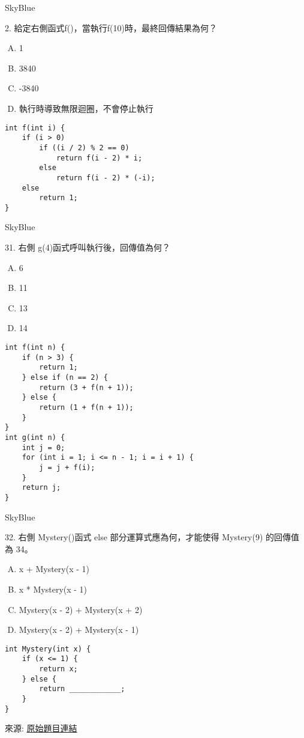 \documentclass{article}
\begin{document}
\renewcommand{\baselinestretch}{1.5}


\begin{sblock}{SkyBlue}

2. 給定右側函式f()，當執行f(10)時，最終回傳結果為何？\\

\begin{enumerate}[(A)]
    \item 1
    \item 3840
    \item -3840
    \item 執行時導致無限迴圈，不會停止執行
\end{enumerate}

\tcblower
\begin{verbatim}
int f(int i) {
	if (i > 0)
		if ((i / 2) % 2 == 0)
			return f(i - 2) * i;
		else
			return f(i - 2) * (-i);
	else
		return 1;
}
\end{verbatim}
\end{sblock}

\begin{sblock}{SkyBlue}

31. 右側 g(4)函式呼叫執行後，回傳值為何？\\

\begin{enumerate}[(A)]
    \item 6
    \item 11
    \item 13
    \item 14
\end{enumerate}

\tcblower

\begin{verbatim}
int f(int n) {
	if (n > 3) {
		return 1;
	} else if (n == 2) {
		return (3 + f(n + 1));
	} else {
		return (1 + f(n + 1));
	}
}
int g(int n) {
	int j = 0;
	for (int i = 1; i <= n - 1; i = i + 1) {
		j = j + f(i);
	}
	return j;
}
\end{verbatim}

\end{sblock}
\begin{sblock}{SkyBlue}

32. 右側 Mystery()函式 else 部分運算式應為何，才能使得 Mystery(9) 的回傳值為 34。\\

\begin{enumerate}[(A)]
	\item x + Mystery(x - 1)
	\item x * Mystery(x - 1)
	\item Mystery(x - 2) + Mystery(x + 2)
	\item Mystery(x - 2) + Mystery(x - 1)
\end{enumerate}

\tcblower
\begin{verbatim}
int Mystery(int x) {
	if (x <= 1) {
		return x;
	} else {
		return ____________;
	}
}
\end{verbatim}
\end{sblock}

來源:
\href{https://apcs.csie.ntnu.edu.tw/wp-content/uploads/2022/10/%E8%A7%80%E5%BF%B5%E9%A1%8C_%E9%A1%8C%E5%9E%8B%E7%AF%84%E4%BE%8B.pdf}{原始題目連結}
\end{document}
